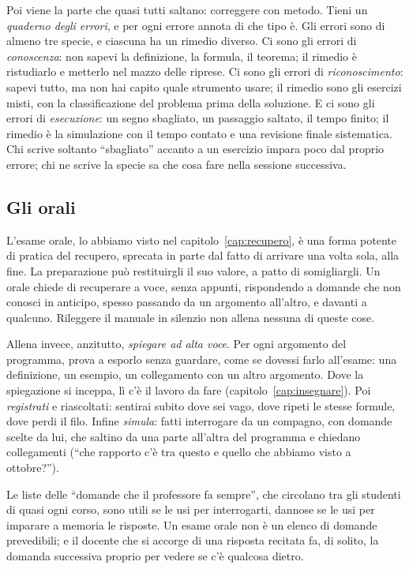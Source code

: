 Poi viene la parte che quasi tutti saltano: correggere con metodo.
Tieni un \emph{quaderno degli errori}, e per ogni errore annota di che
tipo è. Gli errori sono di almeno tre specie, e ciascuna ha un rimedio
diverso. Ci sono gli errori di \emph{conoscenza}: non sapevi la
definizione, la formula, il teorema; il rimedio è ristudiarlo e
metterlo nel mazzo delle riprese. Ci sono gli errori di
\emph{riconoscimento}: sapevi tutto, ma non hai capito quale strumento
usare; il rimedio sono gli esercizi misti, con la classificazione del
problema prima della soluzione. E ci sono gli errori di
\emph{esecuzione}: un segno sbagliato, un passaggio saltato, il tempo
finito; il rimedio è la simulazione con il tempo contato e una
revisione finale sistematica. Chi scrive soltanto \enquote{sbagliato}
accanto a un esercizio impara poco dal proprio errore; chi ne scrive la
specie sa che cosa fare nella sessione successiva.

\subsection*{Gli orali}

L'esame orale, lo abbiamo visto nel capitolo~\ref{cap:recupero}, è una
forma potente di pratica del recupero, sprecata in parte dal fatto di
arrivare una volta sola, alla fine. La preparazione può restituirgli
il suo valore, a patto di somigliargli. Un orale chiede di recuperare
a voce, senza appunti, rispondendo a domande che non conosci in
anticipo, spesso passando da un argomento all'altro, e davanti a
qualcuno. Rileggere il manuale in silenzio non allena nessuna di
queste cose.

Allena invece, anzitutto, \emph{spiegare ad alta voce}. Per ogni
argomento del programma, prova a esporlo senza guardare, come se
dovessi farlo all'esame: una definizione, un esempio, un collegamento
con un altro argomento. Dove la spiegazione si inceppa, lì c'è il
lavoro da fare (capitolo~\ref{cap:insegnare}). Poi \emph{registrati} e
riascoltati: sentirai subito dove sei vago, dove ripeti le stesse
formule, dove perdi il filo. Infine \emph{simula}: fatti interrogare
da un compagno, con domande scelte da lui, che saltino da una parte
all'altra del programma e chiedano collegamenti (\enquote{che rapporto
c'è tra questo e quello che abbiamo visto a ottobre?}).

Le liste delle \enquote{domande che il professore fa sempre}, che
circolano tra gli studenti di quasi ogni corso, sono utili se le usi
per interrogarti, dannose se le usi per imparare a memoria le
risposte. Un esame orale non è un elenco di domande prevedibili; e il
docente che si accorge di una risposta recitata fa, di solito, la
domanda successiva proprio per vedere se c'è qualcosa dietro.

